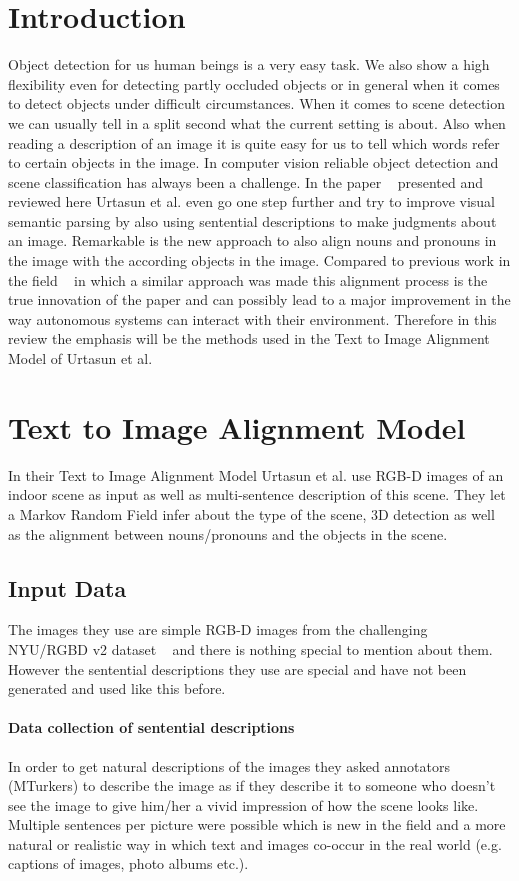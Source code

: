 \documentclass{utue} %
\begin{document}
\section{Introduction}   
Object detection for us human beings is a very easy task. We also show a high flexibility even for detecting partly occluded objects or in general when it comes to detect objects under difficult circumstances. When it comes to scene detection we can usually tell in a split second what the current setting is about. Also when reading a description of an image it is quite easy for us to tell which words refer to certain objects in the image. In computer vision reliable object detection and scene classification has always been a challenge. In the paper ~\cite{urtasun2014} presented and reviewed here Urtasun et al. even go one step further and try to improve visual semantic parsing by also using sentential descriptions to make judgments about an image. Remarkable is the new approach to also align nouns and pronouns in the image with the according objects in the image. Compared to previous work in the field ~\cite{fidler2013} in which a similar approach was made this alignment process is the true innovation of the paper and can possibly lead to a major improvement in the way autonomous systems can interact with their environment. Therefore in this review the emphasis will be the methods used in the Text to Image Alignment Model of Urtasun et al.

\section{Text to Image Alignment Model} 
In their Text to Image Alignment Model Urtasun et al. use RGB-D images of an indoor scene as input as well as multi-sentence description of this scene. They let a Markov Random Field infer about the type of the scene, 3D detection as well as the alignment between nouns/pronouns and the objects in the scene.

\subsection{Input Data}
The images they use are simple RGB-D images from the challenging NYU/RGBD v2 dataset ~\cite{silberman2012} and there is nothing special to mention about them. However the sentential descriptions they use are special and have not been generated and used like this before. 
\paragraph{Data collection of sentential descriptions}
In order to get natural descriptions of the images they asked annotators (MTurkers) to describe the image as if they describe it to someone who doesn't see the image to give him/her a vivid impression of how the scene looks like. Multiple sentences per picture were possible which is new in the field and a more natural or realistic way in which text and images co-occur in the real world (e.g. captions of images, photo albums etc.). 
\end{document}
